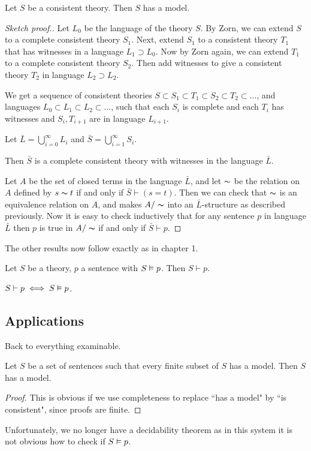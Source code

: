 \documentclass[10pt,a4paper]{article}
\begin{document}
\begin{proposition}
Let $S$ be a consistent theory. Then $S$ has a model.
\end{proposition}
\begin{proof}[Sketch proof.]
Let $L_0$ be the language of the theory $S$. By Zorn, we can extend $S$ to a complete consistent theory $S_1$. Next, extend $S_1$ to a consistent theory $T_1$ that has witnesses in a language $L_1 \supset L_0$. Now by Zorn again, we can extend $T_1$ to a complete consistent theory $S_2$. Then add witnesses to give a consistent theory $T_2$ in language $L_2 \supset L_2$.

We get a sequence of consistent theories $S \subset S_1 \subset T_1 \subset S_2 \subset T_2 \subset \ldots$, and languages $L_0 \subset L_1 \subset L_2 \subset \ldots$, such that each $S_i$ is complete and each $T_i$ has witnesses and $S_i, T_{i+1}$ are in language $L_{i+1}$.

Let $\bar{L} = \bigcup_{i=0}^\infty L_i$ and $\bar{S} = \bigcup_{i=1}^\infty S_i$.

Then $\bar{S}$ is a complete consistent theory with witnesses in the language $\bar{L}$.

Let $A$ be the set of closed terms in the language $\bar{L}$, and let $\thicksim$ be the relation on $A$ defined by $s \thicksim t$ if and only if $\bar{S} \vdash (s=t)$. Then we can check that $\thicksim$ is an equivalence relation on $A$, and makes $A/\thicksim$ into an $\bar{L}$-structure as described previously. Now it is easy to check inductively that for any sentence $p$ in language $\bar{L}$ then $p$ is true in $A/\thicksim$ if and only if $\bar{S} \vdash p$.
\end{proof}
The other results now follow exactly as in chapter 1.
\begin{corollary}
Let $S$ be a theory, $p$ a sentence with $S \vDash p$. Then $S \vdash p$.
\end{corollary}
\begin{theorem}
$S \vdash p \iff S \vDash p$.
\end{theorem}

\subsection{Applications}
Back to everything examinable.
\begin{corollary}
Let $S$ be a set of sentences such that every finite subset of $S$ has a model. Then $S$ has a model.
\end{corollary}
\begin{proof}
This is obvious if we use completeness to replace ``has a model" by ``is consistent", since proofs are finite.
\end{proof}
Unfortunately, we no longer have a decidability theorem as in this system it is not obvious how to check if $S \vDash p$.
\end{document}
